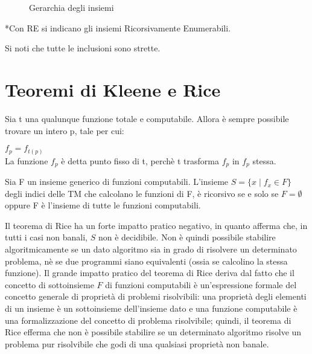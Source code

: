   \begin{figure}[!h]
    \begin{center}    
    \end{center}
    \caption{Gerarchia degli insiemi}    
  \end{figure}

  *Con RE si indicano gli insiemi Ricorsivamente Enumerabili.

  Si noti che tutte le inclusioni sono strette.

  \section{Teoremi di Kleene e Rice}

  \begin{theorem} 
    Sia t una qualunque funzione totale e computabile. Allora è sempre possibile trovare un intero p, tale per cui:
    
    \(f_p=f_{t(p)}\)\\
    La funzione \(f_p\) è detta punto fisso di t, perchè t trasforma \(f_p\) in \(f_p\) stessa.
  \end{theorem}

  \begin{theorem}
    Sia F un insieme generico di funzioni computabili. L'insieme \(S=\{x\;|\;f_x\in F\}\) degli indici delle TM che calcolano le funzioni di F, è ricorsivo se e solo se \(F=\emptyset\) oppure F è l'insieme di tutte le funzioni computabili.
  \end{theorem}

  Il teorema di Rice ha un forte impatto pratico negativo, in quanto afferma che, in tutti i casi non banali, \(S\) non è decidibile. Non è quindi possibile stabilire algoritmicamente se un dato algoritmo sia in grado di risolvere un determinato problema, nè se due programmi siano equivalenti (ossia se calcolino la stessa funzione). Il grande impatto pratico del teorema di Rice deriva dal fatto che il concetto di sottoinsieme \(F\) di funzioni computabili è un'espressione formale del concetto generale di proprietà di problemi risolvibili: una proprietà degli elementi di un insieme è un sottoinsieme dell'insieme dato e una funzione computabile è una formalizzazione del concetto di problema risolvibile; quindi, il teorema di Rice efferma che non è possibile stabilire se un determinato algoritmo risolve un problema pur risolvibile che godi di una qualsiasi proprietà non banale.